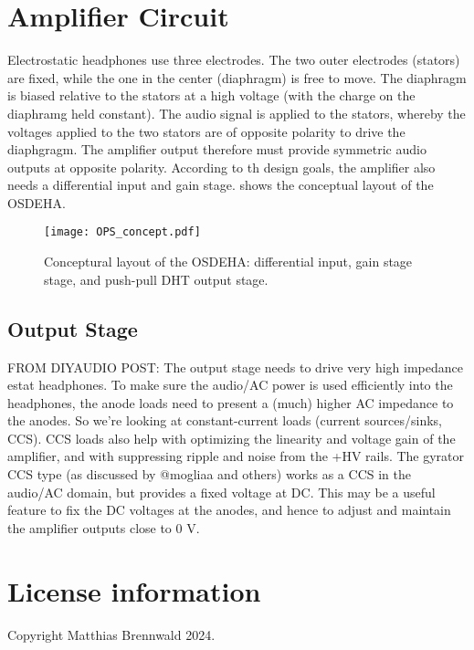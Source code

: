 \section{Amplifier Circuit}

Electrostatic headphones use three electrodes. The two outer electrodes (stators) are fixed, while the one in the center (diaphragm) is free to move. The diaphragm is biased relative to the stators at a high voltage (with the charge on the diaphramg held constant). The audio signal is applied to the stators, whereby the voltages applied to the two stators are of opposite polarity to drive the diaphgragm. The amplifier output therefore must provide symmetric audio outputs at opposite polarity. According to th design goals, the amplifier also needs a differential input and gain stage.  shows the conceptual layout of the OSDEHA.

\begin{figure}
\begin{center}
\texttt{[image: OPS\_concept.pdf]}
\caption{Conceptural layout of the OSDEHA: differential input, gain stage stage, and push-pull DHT output stage.}
\end{center}
\end{figure}


\subsection{Output Stage}
FROM DIYAUDIO POST:
    The output stage needs to drive very high impedance estat headphones. To make sure the audio/AC power is used efficiently into the headphones, the anode loads need to present a (much) higher AC impedance to the anodes. So we're looking at constant-current loads (current sources/sinks, CCS). CCS loads also help with optimizing the linearity and voltage gain of the amplifier, and with suppressing ripple and noise from the +HV rails.
    The gyrator CCS type (as discussed by @mogliaa and others) works as a CCS in the audio/AC domain, but provides a fixed voltage at DC. This may be a useful feature to fix the DC voltages at the anodes, and hence to adjust and maintain the amplifier outputs close to 0 V.


\section{License information} 
Copyright Matthias Brennwald 2024.                                                    

